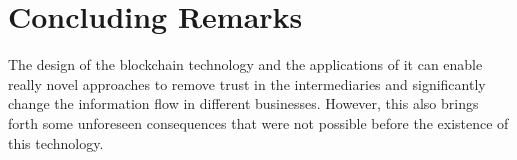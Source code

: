
\chapter{Concluding Remarks} \label{sec:conclusion}


The design of the blockchain technology and the applications of it can enable really novel approaches to remove trust in the intermediaries and significantly change the information flow in different businesses. However, this also brings forth some unforeseen consequences that were not possible before the existence of this technology.









